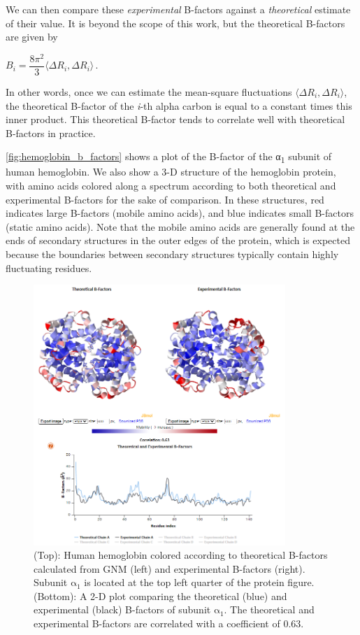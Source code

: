We can then compare these \textit{experimental} B-factors against a \textit{theoretical} estimate of their value. It is beyond the scope of this work, but the theoretical B-factors are given by

\begin{center}
$ B_i = \dfrac{8 \pi^2}{3} \langle \Delta R_i, \Delta R_i \rangle\,. $
\end{center}

In other words, once we can estimate the mean-square fluctuations $\langle \Delta R_i, \Delta R_i \rangle$, the theoretical B-factor of the \textit{i}-th alpha carbon is equal to a constant times this inner product. This theoretical B-factor tends to correlate well with theoretical B-factors in practice.

\autoref{fig:hemoglobin_b_factors} shows a plot of the B-factor of the α\textsubscript{1} subunit of human hemoglobin. We also show a 3-D structure of the hemoglobin protein, with amino acids colored along a spectrum according to both theoretical and experimental B-factors for the sake of comparison. In these structures, red indicates large B-factors (mobile amino acids), and blue indicates small B-factors (static amino acids). Note that the mobile amino acids are generally found at the ends of secondary structures in the outer edges of the protein, which is expected because the boundaries between secondary structures typically contain highly fluctuating residues.\\

\begin{figure}[h]
	\centering
	\mySfFamily
	\includegraphics[width = 0.85\textwidth]{../images/hemoglobin_b_factors.png}
	\caption{(Top): Human hemoglobin colored according to theoretical B-factors calculated from GNM (left) and experimental B-factors (right). Subunit $\text{α}_\text{1}$ is located at the top left quarter of the protein figure. (Bottom): A 2-D plot comparing the theoretical (blue) and experimental (black) B-factors of subunit $\text{α}_\text{1}$.  The theoretical and experimental B-factors are correlated with a coefficient of 0.63.}
	\label{fig:hemoglobin_b_factors}
\end{figure}

